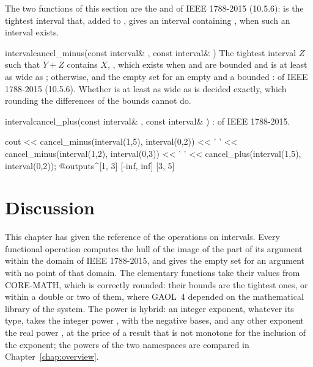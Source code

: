 \documentclass[12pt,a4paper,twoside,openright]{book}
\begin{document}
The two functions of this section are the  and
 of IEEE 1788-2015 (10.5.6):  is
the tightest interval that, added to , gives an interval containing
, when such an interval exists.

\begin{deffun}{interval}{cancel\_minus}{(const interval\& , const interval\& )}
  The tightest interval $Z$ such that $Y+Z$ contains $X$,
  , which
  exists when  and  are bounded and  is at least as wide
  as ; \itv{-\infty}{+\infty} otherwise, and the empty set for an
  empty  and a bounded :  of IEEE 1788-2015
  (10.5.6). Whether  is at least as wide as  is decided
  exactly, which rounding the differences of the bounds cannot
  do.\newinvfive
\end{deffun}

\begin{deffun}{interval}{cancel\_plus}{(const interval\& , const interval\& )}
  :  of IEEE
  1788-2015.\newinvfive
\begin{example}
cout << cancel_minus(interval(1,5), interval(0,2)) << ' '
     << cancel_minus(interval(1,2), interval(0,3)) << ' '
     << cancel_plus(interval(1,5), interval(0,2));
@outputs^[1, 3] [-inf, inf] [3, 5]~
\end{example}
\end{deffun}

\section{Discussion}\label{sec:arithmetic-discussion}

This chapter has given the reference of the operations on intervals. Every
functional operation computes the hull of the image of the part of its
argument within the domain of IEEE 1788-2015, and gives the empty set for an
argument with no point of that domain. The elementary functions take their
values from CORE-MATH, which is correctly rounded: their bounds are the
tightest ones, or within a double or two of them, where GAOL~4 depended on
the mathematical library of the system. The power is hybrid: an integer
exponent, whatever its type, takes the integer power , with the
negative bases, and any other exponent the real power , at the
price of a result that is not monotone for the inclusion of the exponent;
the powers of the two namespaces are compared in Chapter~\ref{chap:overview}.
\end{document}
